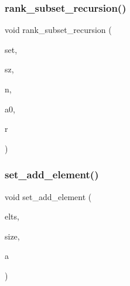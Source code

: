 \subsubsection{\texorpdfstring{rank\+\_\+subset\+\_\+recursion()}{rank\_subset\_recursion()}}
{\footnotesize\ttfamily void rank\+\_\+subset\+\_\+recursion (\begin{DoxyParamCaption}\item[{\mbox{\hyperlink{galois_8h_a09fddde158a3a20bd2dcadb609de11dc}{I\+NT}} $\ast$}]{set,  }\item[{\mbox{\hyperlink{galois_8h_a09fddde158a3a20bd2dcadb609de11dc}{I\+NT}}}]{sz,  }\item[{\mbox{\hyperlink{galois_8h_a09fddde158a3a20bd2dcadb609de11dc}{I\+NT}}}]{n,  }\item[{\mbox{\hyperlink{galois_8h_a09fddde158a3a20bd2dcadb609de11dc}{I\+NT}}}]{a0,  }\item[{\mbox{\hyperlink{galois_8h_a09fddde158a3a20bd2dcadb609de11dc}{I\+NT}} \&}]{r }\end{DoxyParamCaption})}

\mbox{\label{combinatorics_8_c_ad719381fabdf0a63b877ba86bdfa4df3}} 
\subsubsection{\texorpdfstring{set\+\_\+add\+\_\+element()}{set\_add\_element()}}
{\footnotesize\ttfamily void set\+\_\+add\+\_\+element (\begin{DoxyParamCaption}\item[{\mbox{\hyperlink{galois_8h_a09fddde158a3a20bd2dcadb609de11dc}{I\+NT}} $\ast$}]{elts,  }\item[{\mbox{\hyperlink{galois_8h_a09fddde158a3a20bd2dcadb609de11dc}{I\+NT}} \&}]{size,  }\item[{\mbox{\hyperlink{galois_8h_a09fddde158a3a20bd2dcadb609de11dc}{I\+NT}}}]{a }\end{DoxyParamCaption})}

\mbox{\label{combinatorics_8_c_a2b9c08811d5de04f3c97675bbcc85aa4}} 
